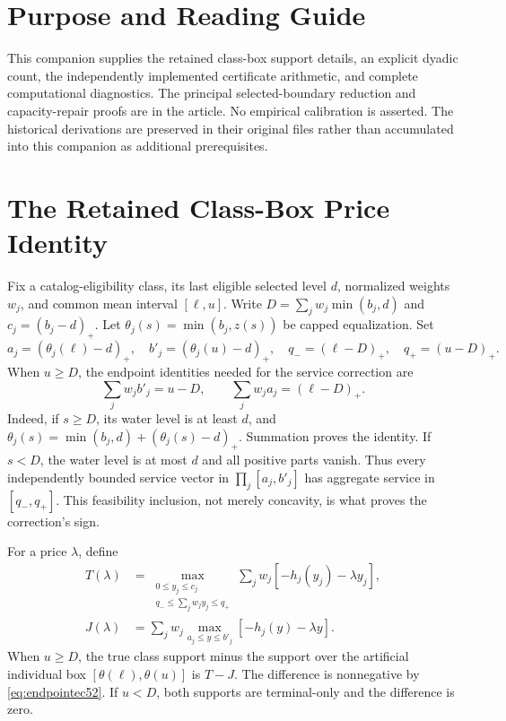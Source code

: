 \section{Purpose and Reading Guide}
This companion supplies the retained class-box support details, an explicit dyadic count, the independently implemented certificate arithmetic, and complete computational diagnostics. The principal selected-boundary reduction and capacity-repair proofs are in the article. No empirical calibration is asserted. The historical derivations are preserved in their original files rather than accumulated into this companion as additional prerequisites.

\section{The Retained Class-Box Price Identity}\label{sec:boxec52}
Fix a catalog-eligibility class, its last eligible selected level $d$, normalized weights $w_j$, and common mean interval $[\ell,u]$. Write $D=\sum_jw_j\min(b_j,d)$ and $c_j=(b_j-d)_+$. Let $\theta_j(s)=\min(b_j,z(s))$ be capped equalization. Set
\[
 a_j=(\theta_j(\ell)-d)_+,\quad b'_j=(\theta_j(u)-d)_+,\quad
 q_-=(\ell-D)_+,\quad q_+=(u-D)_+.
\]
When $u\geq D$, the endpoint identities needed for the service correction are
\begin{equation}\label{eq:endpointec52}
 \sum_jw_jb'_j=u-D,\qquad \sum_jw_ja_j=(\ell-D)_+.
\end{equation}
Indeed, if $s\geq D$, its water level is at least $d$, and $\theta_j(s)=\min(b_j,d)+(\theta_j(s)-d)_+$. Summation proves the identity. If $s<D$, the water level is at most $d$ and all positive parts vanish. Thus every independently bounded service vector in $\prod_j[a_j,b'_j]$ has aggregate service in $[q_-,q_+]$. This feasibility inclusion, not merely concavity, is what proves the correction's sign.

For a price $\lambda$, define
\begin{align}
 T(\lambda)&=\max_{\substack{0\leq y_j\leq c_j\\q_-\leq\sum_jw_jy_j\leq q_+}}
 \sum_jw_j[-h_j(y_j)-\lambda y_j],\label{eq:Tec52}\\
 J(\lambda)&=\sum_jw_j\max_{a_j\leq y\leq b'_j}[-h_j(y)-\lambda y].\label{eq:Jec52}
\end{align}
When $u\geq D$, the true class support minus the support over the artificial individual box $[\theta(\ell),\theta(u)]$ is $T-J$. The difference is nonnegative by \eqref{eq:endpointec52}. If $u<D$, both supports are terminal-only and the difference is zero.

